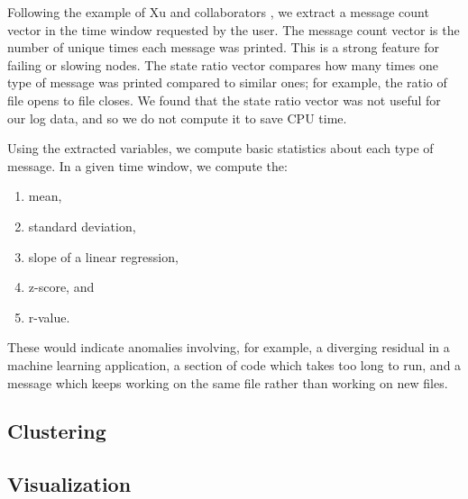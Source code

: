 \documentclass[conference]{style/acmsiggraph}
\begin{document}
Following the example of Xu and collaborators \cite{Xu09}, we extract a message count vector in the time window requested by the user.
The message count vector is the number of unique times each message was printed.
This is a strong feature for failing or slowing nodes.
The state ratio vector compares how many times one type of message was printed compared to similar ones; for example, the ratio of file opens to file closes.
We found that the state ratio vector was not useful for our log data, and so we do not compute it to save CPU time.

Using the extracted variables, we compute basic statistics about each type of message.
In a given time window, we compute the:
\begin{enumerate}
\item mean,
\item standard deviation,
\item slope of a linear regression,
\item z-score, and
\item r-value.
\end{enumerate}
These would indicate anomalies involving, for example, a diverging residual in a machine learning application, a section of code which takes too long to run, and a message which keeps working on the same file rather than working on new files.

\subsection{Clustering}

\subsection{Visualization}

% 
\end{document}
